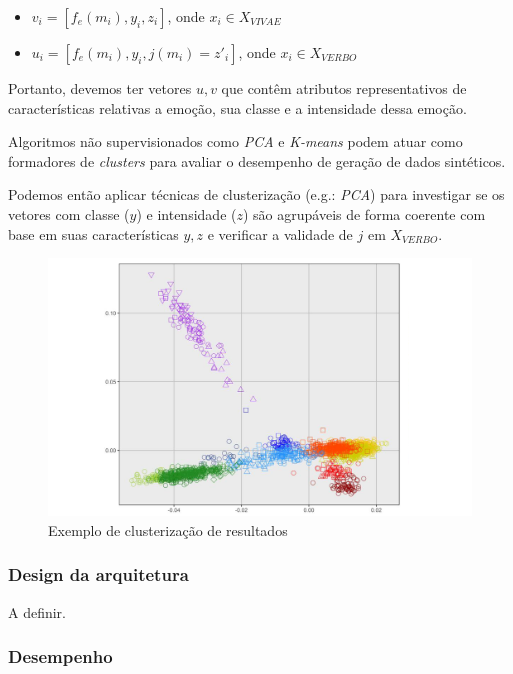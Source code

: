 \begin{itemize}
    \item $v_i = [f_e(m_i), y_i, z_i]$, onde $x_i \in X_{VIVAE}$
    \item $u_i = [f_e(m_i), y_i, j(m_i) = z'_i]$, onde $x_i \in X_{VERBO}$
\end{itemize}

Portanto, devemos ter vetores $u,v$ que contêm atributos representativos de características relativas a emoção, sua classe e a intensidade dessa emoção.

Algoritmos não supervisionados como \textit{PCA} e \textit{K-means} podem atuar como formadores de \textit{clusters} para avaliar o desempenho de geração de dados sintéticos.

Podemos então aplicar técnicas de clusterização (e.g.: \textit{PCA}) para investigar se os vetores com classe ($y$) e intensidade ($z$) são agrupáveis de forma coerente com base em suas características $y, z$ e verificar a validade de $j$ em $X_{VERBO}$.


\begin{figure}[!h]
\centering
\includegraphics[width=1.0\textwidth]{imagens/p-naosupervisionado.png}
\caption{\label{fig:clusterizacaoresults}Exemplo de clusterização de resultados}
\end{figure}

\subsubsection{Design da arquitetura}

A definir.

\subsubsection{Desempenho}

